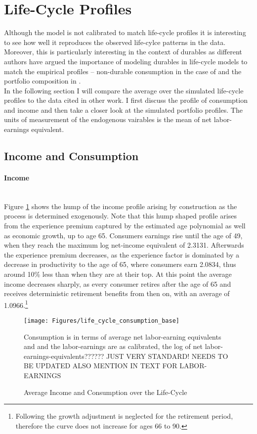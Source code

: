 \documentclass[a4paper,12pt,legno]{article}
\newcommand{\myparagraph}[1]{\paragraph{#1}\mbox{}\\}
\begin{document}
\section{Life-Cycle Profiles}
\label{life_cycle_profiles}

Although the model is not calibrated to match life-cycle profiles it is interesting to see how well it reproduces the observed life-cylce patterns in the data. Moreover, this is particularly interesting in the context of durables as different authors have argued the importance of modeling durables in life-cycle models to match the empirical profiles \--- non-durable consumption in the case of \cite{FV&K2011} and the portfolio composition in \cite{yang2009}. \\
In the following section I will compare the average over the simulated life-cycle profiles to the data cited in other work. I first discuss the profile of consumption and income and then take a closer look at the simulated portfolio profiles. 
The units of measurement of the endogenous vairables is the mean of net labor-earnings equivalent.

\subsection{Income and Consumption}

\myparagraph{Income} Figure \ref{consumption_life_cycle} shows the hump of the income profile arising by construction as the process is determined exogenously. Note that this hump shaped profile arises from the experience premium captured by the estimated age polynomial as well as economic growth, up to age 65. Consumers earnings rise until the age of 49, when they reach the maximum log net-income equivalent of 2.3131. Afterwards the experience premium decreases, as the experience factor is dominated by a decrease in productivity to the age of 65, where consumers earn 2.0834, thus around 10\% less than when they are at their top. At this point the average income decreases sharply, as every consumer retires after the age of 65 and receives deterministic retirement benefits from then on, with an average of 1.0966.\footnote{Following \cite{hintermaier2011} the growth adjustment is neglected for the retirement period, therefore the curve does not increase for ages 66 to 90.} 

\begin{figure}[!htbp]
\caption{Average Income and Consumption over the Life-Cycle} 
\label{consumption_life_cycle}	%
\centering
\texttt{[image: Figures/life\_cycle\_consumption\_base]}  %

\begin{minipage}{0.8\linewidth}
\footnotesize{Consumption is in terms of average net labor-earning equivalents and and the labor-earnings are as calibrated, the log of net labor-earnings-equivalents?????? JUST VERY STANDARD! NEEDS TO BE UPDATED ALSO MENTION IN TEXT FOR LABOR-EARNINGS}
\end{minipage}

\end{figure}
\end{document}
